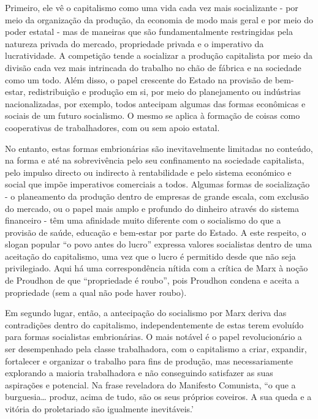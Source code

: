 Primeiro, ele vê o capitalismo como uma vida cada vez mais socializante - por meio da organização da produção, da economia de modo mais geral e por meio do poder estatal - mas de maneiras que são fundamentalmente restringidas pela natureza privada do mercado, propriedade privada e o imperativo da lucratividade. A competição tende a socializar a produção capitalista por meio da divisão cada vez mais intrincada do trabalho no chão de fábrica e na sociedade como um todo. Além disso, o papel crescente do Estado na provisão de bem-estar, redistribuição e produção em si, por meio do planejamento ou indústrias nacionalizadas, por exemplo, todos antecipam algumas das formas econômicas e sociais de um futuro socialismo. O mesmo se aplica à formação de coisas como cooperativas de trabalhadores, com ou sem apoio estatal.
 \par 
No entanto, estas formas embrionárias são inevitavelmente limitadas no conteúdo, na forma e até na sobrevivência pelo seu confinamento na sociedade capitalista, pelo impulso directo ou indirecto à rentabilidade e pelo sistema económico e social que impõe imperativos comerciais a todos. Algumas formas de socialização - o planeamento da produção dentro de empresas de grande escala, com exclusão do mercado, ou o papel mais amplo e profundo do dinheiro através do sistema financeiro - têm uma afinidade muito diferente com o socialismo do que a provisão de saúde, educação e bem-estar por parte do Estado. A este respeito, o slogan popular “o povo antes do lucro” expressa valores socialistas dentro de uma aceitação do capitalismo, uma vez que o lucro é permitido desde que não seja privilegiado. Aqui há uma correspondência nítida com a crítica de Marx à noção de Proudhon de que “propriedade é roubo”, pois Proudhon condena e aceita a propriedade (sem a qual não pode haver roubo).
 \par 
Em segundo lugar, então, a antecipação do socialismo por Marx deriva das contradições dentro do capitalismo, independentemente de estas terem evoluído para formas socialistas embrionárias. O mais notável é o papel revolucionário a ser desempenhado pela classe trabalhadora, com o capitalismo a criar, expandir, fortalecer e organizar o trabalho para fins de produção, mas necessariamente explorando a maioria trabalhadora e não conseguindo satisfazer as suas aspirações e potencial. Na frase reveladora do Manifesto Comunista, “o que a burguesia… produz, acima de tudo, são os seus próprios coveiros. A sua queda e a vitória do proletariado são igualmente inevitáveis.’
 \par 
